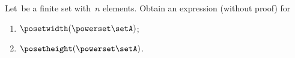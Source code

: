 \vfill
\begin{gradedexercise}
    \label{ex:MeasurePowerPoset}

    Let~\setA be a finite set with~$n$ elements.
    Obtain an expression (without proof) for
    \begin{enumerate}
        \item $\posetwidth(\powerset \setA)$;
        \item $\posetheight(\powerset \setA)$.
    \end{enumerate}
\end{gradedexercise}

